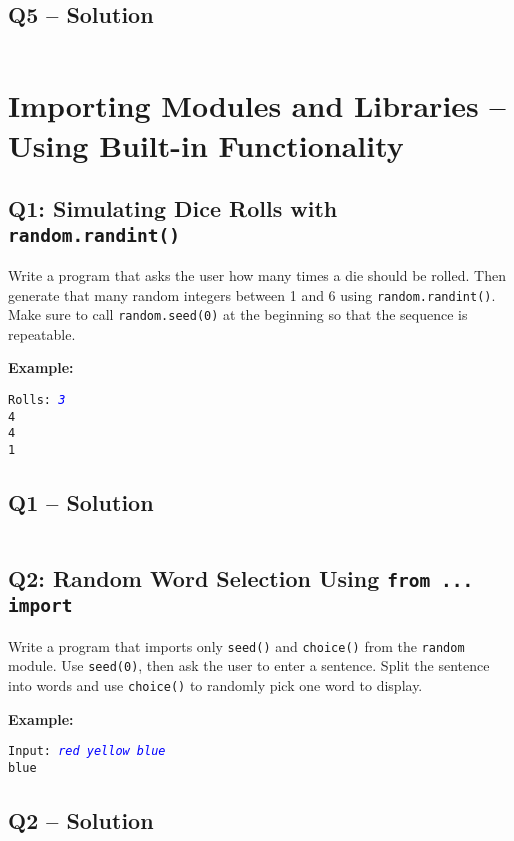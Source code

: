 \documentclass[a4paper,11pt]{article}
\begin{document}
\subsection*{Q5 – Solution}
\inputminted{python}{Files/5/5.py}

\newpage
\section{Importing Modules and Libraries – Using Built-in Functionality}

\subsection*{Q1: Simulating Dice Rolls with \texttt{random.randint()}}
Write a program that asks the user how many times a die should be rolled. Then generate that many random integers between 1 and 6 using \texttt{random.randint()}. Make sure to call \texttt{random.seed(0)} at the beginning so that the sequence is repeatable.

\textbf{Example:}
\begin{flushleft}
	\texttt{Rolls: \textcolor{blue}{\textit{3}}}\\
	\texttt{4\\4\\1}
\end{flushleft}

\subsection*{Q1 – Solution}
\inputminted{python}{Files/6/1.py}

\subsection*{Q2: Random Word Selection Using \texttt{from ... import}}
Write a program that imports only \texttt{seed()} and \texttt{choice()} from the \texttt{random} module. Use \texttt{seed(0)}, then ask the user to enter a sentence. Split the sentence into words and use \texttt{choice()} to randomly pick one word to display.

\textbf{Example:}
\begin{flushleft}
	\texttt{Input: \textcolor{blue}{\textit{red yellow blue}}}\\
	\texttt{blue}
\end{flushleft}

\subsection*{Q2 – Solution}
\inputminted{python}{Files/6/2.py}
\end{document}
